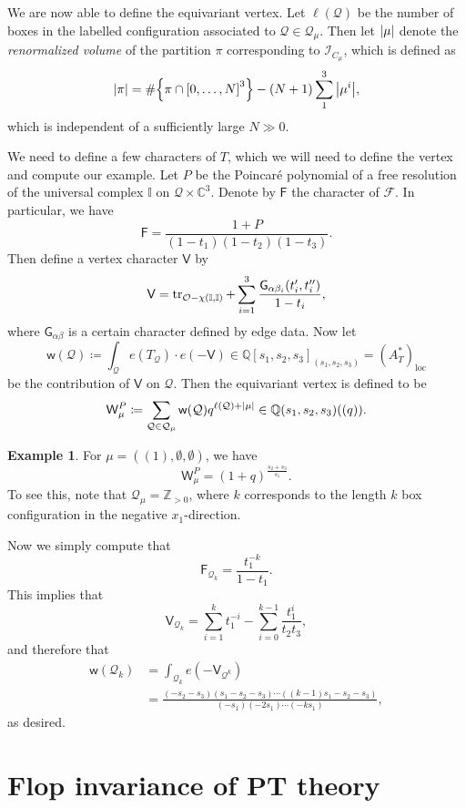 \documentclass{amsart}
\theoremstyle{definition}
\newtheorem{exm}[thm]{Example}
\theoremstyle{remark}
\theoremstyle{plain}
\theoremstyle{definition}
\theoremstyle{remark}
\newcommand{\C}{\mathbb{C}}
\newcommand{\Z}{\mathbb{Z}}
\newcommand{\Q}{\mathbb{Q}}
\newcommand{\mc}[1]{\mathcal{#1}}
\newcommand{\mr}[1]{\mathrm{#1}}
\newcommand{\ms}[1]{\mathsf{#1}}
\newcommand{\1}{\mathbf{1}}
\newcommand{\2}{\mathbf{2}}
\newcommand{\3}{\mathbf{3}}
\begin{document}
We are now able to define the equivariant vertex. Let $\ell(\mc{Q})$ be the number of boxes in the labelled configuration associated to $\mc{Q} \in \mc{Q}_{\mu}$. Then let $\abs{\mu}$ denote the \textit{renormalized volume} of the partition $\pi$ corresponding to $\mc{I}_{C_{\mu}}$, which is defined as
\[ \abs{\pi} = \# \qty{\pi \cap {[0, \ldots, N]}^3} - (N+1) \sum_1^3 \abs{\mu^i}, \]
which is independent of a sufficiently large $N \gg 0$. 

We need to define a few characters of $T$, which we will need to define the vertex and compute our example. Let $P$ be the Poincar\'e polynomial of a free resolution of the universal complex $\mathbb{I}$ on $\mc{Q} \times \C^3$. Denote by $\ms{F}$ the character of $\mc{F}$. In particular, we have
\[ \ms{F} = \frac{1 + P}{(1-t_1)(1-t_2)(1-t_3)}. \]
Then define a vertex character $\ms{V}$ by
\[ \ms{V} = \tr_{\mc{O} - \chi(\mathbb{I}, \mathbb{I})} + \sum_{i=1}^3 \frac{\ms{G}_{\alpha \beta_i} (t_i', t_i'')}{1-t_i}, \]
where $\ms{G}_{\alpha\beta}$ is a certain character defined by edge data.
Now let 
\[ \ms{w}(\mc{Q}) \coloneqq \int_{\mc{Q}} e(T_{\mc{Q}}) \cdot e(-\ms{V}) \in \Q[s_1, s_2, s_3]_{(s_1, s_2, s_3)} = {(A_T^*)}_{\mr{loc}} \]
be the contribution of $\ms{V}$ on $\mc{Q}$. Then the equivariant vertex is defined to be
\[ \ms{W}_{\mu}^P \coloneqq \sum_{\mc{Q} \in \mc{Q}_{\mu}} \ms{w}(\mc{{Q}}) q^{\ell(\mc{Q}) + \abs{\mu}} \in \Q(s_1, s_2, s_3)((q)). \]

\begin{exm}
    For $\mu = ((1), \emptyset, \emptyset)$, we have
    \[ \ms{W}_{\mu}^P = {(1+q)}^{\frac{s_2 + s_3}{s_1}}. \]
    To see this, note that $\mc{Q}_{\mu} = \Z_{>0}$, where $k$ corresponds to the length $k$ box configuration in the negative $x_1$-direction.

    Now we simply compute that
    \[ \ms{F}_{\mc{Q}_k} = \frac{t_1^{-k}}{1-t_1}. \]
    This implies that 
    \[ \ms{V}_{\mc{Q}_k} = \sum_{i=1}^k t_1^{-i} - \sum_{i=0}^{k-1} \frac{t_1^i}{t_2 t_3}, \]
    and therefore that
    \begin{align*}
        \ms{w}(\mc{Q}_k) &= \int_{\mc{Q}_k} e(-\ms{V}_{\mc{Q}^k}) \\
        &= \frac{(-s_2 - s_3)(s_1 - s_2 - s_3) \cdots ((k-1)s_1 - s_2 - s_3)}{(-s_1)(-2s_1) \cdots (-k s_1)},
    \end{align*}
    as desired.
\end{exm}

\section{Flop invariance of PT theory}%
\label{sec:flop_invariance_of_pt_theory}
\end{document}
